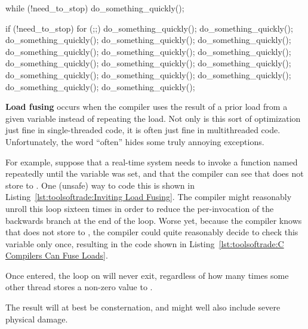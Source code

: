 \begin{listing}[tbp]
\begin{fcvlabel}
\begin{VerbatimL}[commandchars=\\\{\}]
while (!need_to_stop)
	do_something_quickly();
\end{VerbatimL}
\end{fcvlabel}
\caption{Inviting Load Fusing}
\label{lst:toolsoftrade:Inviting Load Fusing}
\end{listing}

\begin{listing}[tbp]
\begin{fcvlabel}
\begin{VerbatimL}[commandchars=\\\[\]]
if (!need_to_stop)
	for (;;) {\lnlbl[loop:b]
		do_something_quickly();
		do_something_quickly();
		do_something_quickly();
		do_something_quickly();
		do_something_quickly();
		do_something_quickly();
		do_something_quickly();
		do_something_quickly();
		do_something_quickly();
		do_something_quickly();
		do_something_quickly();
		do_something_quickly();
		do_something_quickly();
		do_something_quickly();
		do_something_quickly();
		do_something_quickly();
	}\lnlbl[loop:e]
\end{VerbatimL}
\end{fcvlabel}
\caption{C Compilers Can Fuse Loads}
\label{lst:toolsoftrade:C Compilers Can Fuse Loads}
\end{listing}

{\bf Load fusing} occurs when the compiler uses the result of a
prior load from a given variable instead of repeating the load.
Not only is this sort of optimization just fine in single-threaded
code, it is often just fine in multithreaded code.
Unfortunately, the word ``often'' hides some truly annoying exceptions.

For example, suppose that a real-time system needs to invoke a
function named  repeatedly until the
variable  was set, and that the compiler can see
that  does not store to .
One (unsafe) way to code this is shown in
Listing~\ref{lst:toolsoftrade:Inviting Load Fusing}.
The compiler might reasonably unroll this loop sixteen times in order
to reduce the per-invocation of the backwards branch at the end of the
loop.
Worse yet, because the compiler knows that 
does not store to , the compiler could quite reasonably
decide to check this variable only once, resulting in the code shown in
Listing~\ref{lst:toolsoftrade:C Compilers Can Fuse Loads}.
\begin{fcvref}
Once entered, the loop on
 will never exit, regardless of how
many times some other thread stores a non-zero value to .
\end{fcvref}
The result will at best be consternation, and might well also
include severe physical damage.

